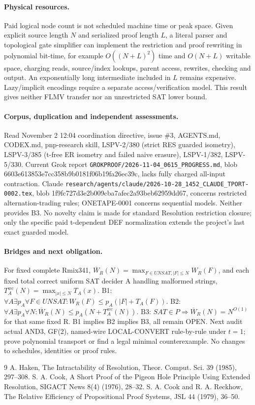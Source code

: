 \documentclass[11pt]{article}
\begin{document}
\paragraph{Physical resources.}
Paid logical node count is not scheduled machine time or peak space. Given explicit source length \(N\) and serialized proof length \(L\), a literal parser and topological gate simplifier can implement the restriction and proof rewriting in polynomial bit-time, for example \(O((N+L)^2)\) time and \(O(N+L)\) writable space, charging reads, source/index lookups, parent access, rewrites, checking and output. An exponentially long intermediate included in \(L\) remains expensive. Lazy/implicit encodings require a separate access/verification model. This result gives neither FLMV transfer nor an unrestricted SAT lower bound.
\paragraph{Corpus, duplication and independent assessments.}
Read November 2 12:04 coordination directive, issue \#3, AGENTS.md, CODEX.md, pnp-research skill, LSPV-2/380 (strict RES guarded isometry), LSPV-3/385 (t-free ER isometry and failed naive erasure), LSPV-1/382, LSPV-5/330. Current Grok report \texttt{GROKPROOF/2026-11-04\_0615\_PROGRESS.md}, blob 6603e613853e7cc358b9b0181f06b19fa26ec39c, lacks fully charged all-input contraction. Claude \texttt{research/agents/claude/2026-10-28\_1452\_CLAUDE\_TPORT-0002.tex}, blob 1f9fc727d3e2b009cba7afec2a93beb62959dd67, concerns restricted alternation-trading rules; ONETAPE-0001 concerns sequential models. Neither provides B3. No novelty claim is made for standard Resolution restriction closure; only the specific paid t-dependent DEF normalization extends the project's last exact guarded model.
\paragraph{Bridges and next obligation.}
For fixed complete Rmix341, \(\overline W_R(N)=\max_{F\in UNSAT,|F|\le N}W_R(F)\), and each fixed total correct uniform SAT decider A handling malformed strings, \(T_A^{wc}(N)=\max_{|x|\le N}T_A(x)\). B1: \(\forall A\exists p_A\forall F\in UNSAT:W_R(F)\le p_A(|F|+T_A(F))\). B2: \(\forall A\exists p_A\forall N:\overline W_R(N)\le p_A(N+T_A^{wc}(N))\). B3: \(SAT\in P\Rightarrow\overline W_R(N)=N^{O(1)}\) for that same fixed R. B1 implies B2 implies B3, all remain OPEN. Next audit actual AND3, GF(2), named-wire LOCAL-CONVERT rule-by-rule under \(t=1\); prove polynomial transport or find a legal minimal counterexample. No changes to schedules, identities or proof rules.
\begin{thebibliography}{9}
 A. Haken, The Intractability of Resolution, Theor. Comput. Sci. 39 (1985), 297--308.
 S. A. Cook, A Short Proof of the Pigeon Hole Principle Using Extended Resolution, SIGACT News 8(4) (1976), 28--32.
 S. A. Cook and R. A. Reckhow, The Relative Efficiency of Propositional Proof Systems, JSL 44 (1979), 36--50.
\end{thebibliography}
\end{document}
